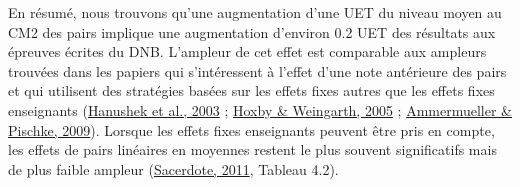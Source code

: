 \documentclass[
]{book}
\begin{document}
\quad En résumé, nous trouvons qu'une augmentation d'une UET du niveau moyen au CM2 des pairs implique une augmentation d'environ 0.2 UET des résultats aux épreuves écrites du DNB. L'ampleur de cet effet est comparable aux ampleurs trouvées dans les papiers qui s'intéressent à l'effet d'une note antérieure des pairs et qui utilisent des stratégies basées sur les effets fixes autres que les effets fixes enseignants (\protect\hyperlink{ref-HAN:eal:03}{Hanushek et al., 2003} ; \protect\hyperlink{ref-HOX:WEI:05}{Hoxby \& Weingarth, 2005} ; \protect\hyperlink{ref-AMM:PIS:09}{Ammermueller \& Pischke, 2009}). Lorsque les effets fixes enseignants peuvent être pris en compte, les effets de pairs linéaires en moyennes restent le plus souvent significatifs mais de plus faible ampleur (\protect\hyperlink{ref-SAC:11}{Sacerdote, 2011}, Tableau 4.2).
\end{document}
